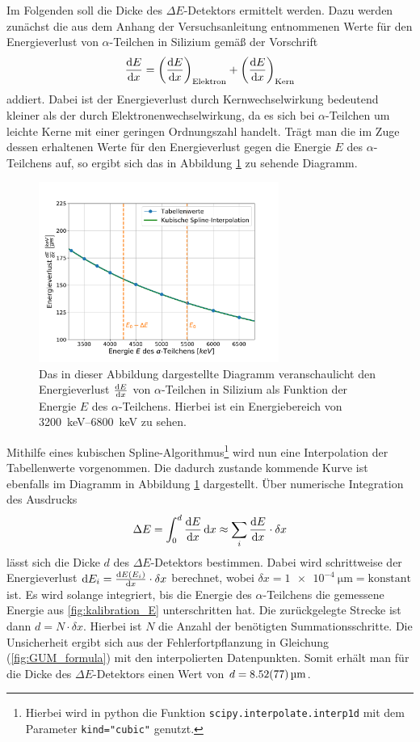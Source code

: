 Im Folgenden soll die Dicke des $\Delta E$-Detektors ermittelt werden.
Dazu werden zunächst die aus dem Anhang der Versuchsanleitung\cite{wwu} entnommenen Werte für den Energieverlust von $\alpha$-Teilchen in Silizium gemäß der Vorschrift
\begin{align}
	\dv{E}{x}= \left( \dv{E}{x}\right)_\text{Elektron} + \left(\dv{E}{x}\right)_\text{Kern}
\end{align}
addiert.
Dabei ist der Energieverlust durch Kernwechselwirkung bedeutend kleiner als der durch Elektronenwechselwirkung, da es sich bei $\alpha$-Teilchen um leichte Kerne mit einer geringen Ordnungszahl handelt.
Trägt man die im Zuge dessen erhaltenen Werte für den Energieverlust gegen die Energie $E$ des $\alpha$-Teilchens auf, so ergibt sich das in Abbildung \ref{EnergyLossSpectrum} zu sehende Diagramm.
\begin{figure}[ht]
	\centering
	\includegraphics[width=0.7\textwidth]{src/EnergyLossSpectrum}
	\caption{Das in dieser Abbildung dargestellte Diagramm veranschaulicht den Energieverlust $\dv{E}{x}$ von $\alpha$-Teilchen in Silizium als Funktion der Energie $E$ des $\alpha$-Teilchens. Hierbei ist ein Energiebereich von \SIrange{3200}{6800}{\kilo\electronvolt} zu sehen.}
	\label{EnergyLossSpectrum}
\end{figure}
Mithilfe eines kubischen Spline-Algorithmus\footnote{Hierbei wird in python die Funktion \texttt{scipy.interpolate.interp1d} mit dem Parameter \texttt{kind="cubic"} genutzt.} wird nun eine Interpolation der Tabellenwerte vorgenommen.
Die dadurch zustande kommende Kurve ist ebenfalls im Diagramm in Abbildung \ref{EnergyLossSpectrum} dargestellt.
Über numerische Integration des Ausdrucks
\begin{align}
	\label{eq:numInt}
	\Delta E = \int_{0}^{d} \dv{E}{x} (E) \dd{x} \approx \sum_i \dv{E}{x} (E_i) \cdot \delta x
\end{align}
lässt sich die Dicke $d$ des $\Delta E$-Detektors bestimmen.
Dabei wird schrittweise der Energieverlust $\dd E_i = \dv{E\left(E_i\right)}{x} \cdot \delta x$ berechnet, wobei $\delta x = \SI{1e-4}{\micro\meter} = \text{konstant}$ ist.
Es wird solange integriert, bis die Energie des $\alpha$-Teilchens die gemessene Energie aus \cref{fig:kalibration_E} unterschritten hat.
Die zurückgelegte Strecke ist dann $d = N \cdot \delta x$.
Hierbei ist $N$ die Anzahl der benötigten Summationsschritte.
Die Unsicherheit ergibt sich aus der Fehlerfortpflanzung in Gleichung (\ref{fig:GUM_formula}) mit den interpolierten Datenpunkten.
Somit erhält man für die Dicke des $\Delta E$-Detektors einen Wert von $d=\SI{8.52 +- 0.77}{\micro\meter}$. 

